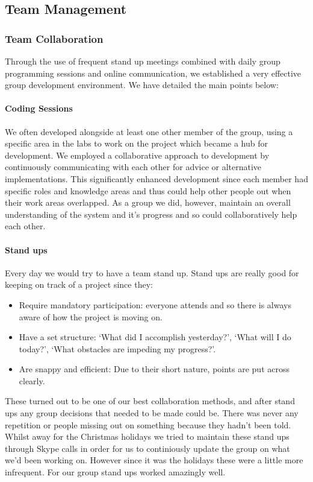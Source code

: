 \subsection{Team Management}
  \subsubsection{Team Collaboration}

    Through the use of frequent stand up meetings combined with daily group programming sessions and online communication, we established a very effective group development environment. We have detailed the main points below:

    \paragraph{Coding Sessions} We often developed alongside at least one other member of the group, using a specific area in the labs to work on the project which became a hub for development. We employed a collaborative approach to development by continuously communicating with each other for advice or alternative implementations. This significantly enhanced development since each member had specific roles and knowledge areas and thus could help other people out when their work areas overlapped. As a group we did, however, maintain an overall understanding of the system and it's progress and so could collaboratively help each other.

    \paragraph{Stand ups} Every day we would try to have a team stand up. Stand ups are really good for keeping on track of a project since they:
    \begin{itemize}
        \item Require mandatory participation: everyone attends and so there is always aware of how the project is moving on.
        \item Have a set structure: `What did I accomplish yesterday?', `What will I do today?', `What obstacles are impeding my progress?'.
        \item Are snappy and efficient: Due to their short nature, points are put across clearly.
    \end{itemize}
    These turned out to be one of our best collaboration methods, and after stand ups any group decisions that needed to be made could be. There was never any repetition or people missing out on something because they hadn't been told.
    Whilst away for the Christmas holidays we tried to maintain these stand ups through Skype\cite{skype} calls in order for us to continiously update the group on what we'd been working on. However since it was the holidays these were a little more infrequent.
    For our group stand ups worked amazingly well.

